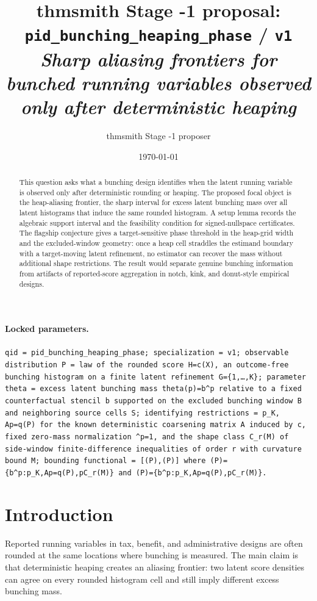\documentclass[11pt]{article}
\title{thmsmith Stage -1 proposal: \texttt{pid\_bunching\_heaping\_phase} / \texttt{v1}%
  \\ \large\textit{Sharp aliasing frontiers for bunched running variables observed only after deterministic heaping}}
\author{thmsmith Stage -1 proposer}
\date{\today}
\newcommand{\one}{\mathbf{1}}
\newcommand{\transpose}{\mathsf{T}}
\theoremstyle{definition}
\theoremstyle{plain}
\theoremstyle{remark}
\begin{document}
\maketitle


\paragraph{Locked parameters.}
\texttt{qid = pid\_bunching\_heaping\_phase; specialization = v1; observable distribution P = law of the rounded score H=c(X), an outcome-free bunching histogram on a finite latent refinement G=\{1,\ldots,K\}; parameter theta = excess latent bunching mass theta(p)=b^\transpose p relative to a fixed counterfactual stencil b supported on the excluded bunching window B and neighboring source cells S; identifying restrictions = p\in\Delta_K, Ap=q(P) for the known deterministic coarsening matrix A induced by c, fixed zero-mass normalization \one^\transpose p=1, and the shape class C_r(M) of side-window finite-difference inequalities of order r with curvature bound M; bounding functional = [\underline\theta(P),\overline\theta(P)] where \underline\theta(P)=\inf\{b^\transpose p:p\in\Delta_K,Ap=q(P),p\in C_r(M)\} and \overline\theta(P)=\sup\{b^\transpose p:p\in\Delta_K,Ap=q(P),p\in C_r(M)\}.}

\begin{abstract}
This question asks what a bunching design identifies when the latent running variable is observed only after deterministic rounding or heaping. The proposed focal object is the heap-aliasing frontier, the sharp interval for excess latent bunching mass over all latent histograms that induce the same rounded histogram. A setup lemma records the algebraic support interval and the feasibility condition for signed-nullspace certificates. The flagship conjecture gives a target-sensitive phase threshold in the heap-grid width and the excluded-window geometry: once a heap cell straddles the estimand boundary with a target-moving latent refinement, no estimator can recover the mass without additional shape restrictions. The result would separate genuine bunching information from artifacts of reported-score aggregation in notch, kink, and donut-style empirical designs.
\end{abstract}

\section{Introduction}
Reported running variables in tax, benefit, and administrative designs are often rounded at the same locations where bunching is measured. The main claim is that deterministic heaping creates an aliasing frontier: two latent score densities can agree on every rounded histogram cell and still imply different excess bunching mass.
\end{document}
